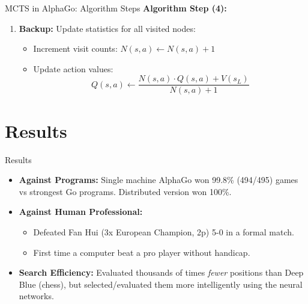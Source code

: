 \documentclass{beamer}
\begin{document}
\begin{frame}{MCTS in AlphaGo: Algorithm Steps}
    \textbf{Algorithm Step (4):}
    \vspace{2ex}
    \begin{enumerate}
        \setlength{\itemsep}{3ex}
        \setcounter{enumi}{3}
        \item \textbf{Backup:} Update statistics for all visited nodes:
        \vspace{2ex}
        \begin{itemize}
            \item Increment visit counts: $N(s, a) \leftarrow N(s, a) + 1$
            \item Update action values:
            \[ Q(s, a) \leftarrow \frac{N(s,a) \cdot Q(s,a) + V(s_L)}{N(s,a) + 1} \]
        \end{itemize}
    \end{enumerate}
\end{frame}

\section{Results}
\begin{frame}{Results}
    \begin{itemize}
        \item \textbf{Against Programs:} Single machine AlphaGo won 99.8\% (494/495) games vs strongest Go programs. Distributed version won 100\%.
        \item \textbf{Against Human Professional:}
        \vspace{2ex}
        \begin{itemize}
            \item Defeated Fan Hui (3x European Champion, 2p) 5-0 in a formal match.
            \item First time a computer beat a pro player without handicap.
        \end{itemize}
        \item \textbf{Search Efficiency:} Evaluated thousands of times \textit{fewer} positions than Deep Blue (chess), but selected/evaluated them more intelligently using the neural networks.
    \end{itemize}
\end{frame}
\end{document}
